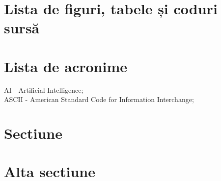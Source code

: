 \documentclass[a4paper,12pt]{report}
\begin{document}
	


\newpage
\setcounter{page}{2}
\tableofcontents
\newpage
{}
\renewcommand{\bibname}{Bibliografie}
\renewcommand\lstlistlistingname{\normalsize{CODURI SURSĂ}}
\renewcommand{\lstlistingname}{\normalsize{Secvență de Cod}}
\renewcommand{\listfigurename}{FIGURI}
\renewcommand{\cftloftitlefont}{\normalsize}
\renewcommand{\cftfigfont}{\normalsize}
\renewcommand{\cftfigpagefont}{\normalsize}
\renewcommand{\listtablename}{TABELE}
\renewcommand{\cftlottitlefont}{\normalsize}
\renewcommand{\cfttabfont}{\normalsize}
\renewcommand{\cfttabpagefont}{\normalsize}

\section*{Lista de figuri, tabele și coduri sursă}

\begingroup
\let\clearpage\relax
\listoffigures
\let\clearpage\relax
\listoftables
\let\clearpage\relax
\lstlistoflistings
\setcounter{page}{5}
\endgroup


\clearpage

\section*{Lista de acronime}


\noindent 
AI - Artificial Intelligence; \\
ASCII - American Standard Code for Information Interchange; \\

\clearpage


\section{Sectiune}

\lipsum[2-4]
\clearpage


\section{Alta sectiune}
\end{document}
